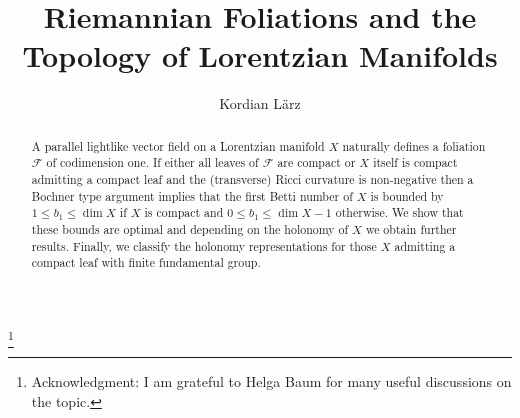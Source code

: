 \documentclass[a4paper,10pt,twoside]{amsart}
\theoremstyle{definition}
\theoremstyle{remark}
\numberwithin{equation}{section}
\begin{document}
\title{Riemannian Foliations and the Topology of Lorentzian Manifolds}
\author{Kordian L\"{a}rz}
\address{Humboldt-Universit\"{a}t Berlin, Institut f\"{u}r Mathematik R. 1.305, Rudower Chaussee 25, 12489 Berlin}
\thanks{{\sc Acknowledgment:} I am grateful to Helga Baum for many useful discussions on the topic.}
\begin{abstract}
	A parallel lightlike vector field on a Lorentzian manifold $X$ naturally defines a foliation $\mathcal{F}$ of codimension one.
	If either all leaves of $\mathcal{F}$ are compact or $X$ itself is compact admitting a compact leaf and the (transverse) Ricci curvature
	is non-negative then a Bochner type argument implies that the first Betti number of $X$ is bounded by $1 \leq b_{1} \leq \dim X$ if $X$ is
	compact and $0 \leq b_{1} \leq \dim X -1$ otherwise. We show that these bounds are optimal and depending on the holonomy of $X$ we obtain
	further results. Finally, we classify the holonomy representations for those $X$ admitting a compact leaf with finite fundamental group.
\end{abstract}
\maketitle
\end{document}

